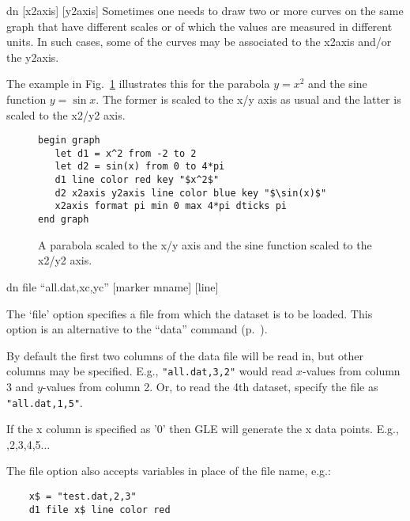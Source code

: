 \begin{commanddescription}
\item[{\sf dn [x2axis] [y2axis]}]
 
Sometimes one needs to draw two or more curves on the same graph that have different scales or of which the values are measured in different units. In such cases, some of the curves may be associated to the x2axis and/or the y2axis.

The example in Fig.~\ref{fig:y2scale} illustrates this for the parabola $y = x^2$ and the sine function $y = \sin{x}$. The former is scaled to the x/y axis as usual and the latter is scaled to the x2/y2 axis.

\begin{figure}[tb]
\begin{minipage}[c]{9.2cm}
\begin{Verbatim}
begin graph
   let d1 = x^2 from -2 to 2
   let d2 = sin(x) from 0 to 4*pi
   d1 line color red key "$x^2$"
   d2 x2axis y2axis line color blue key "$\sin(x)$"
   x2axis format pi min 0 max 4*pi dticks pi
end graph
\end{Verbatim}
\end{minipage}
\hfill
\begin{minipage}[c]{7cm}
\mbox{}
\end{minipage}
\caption{\label{fig:y2scale}A parabola scaled to the x/y axis and the sine function scaled to the x2/y2 axis.}
\end{figure}

\item[{\sf dn file ``all.dat,xc,yc'' [marker {\sf mname}] [line]}   ]

The `file' option specifies a file from which the dataset is to be loaded. This option is an alternative to the ``data'' command (p.~\pageref{cmd:data}).

By default the first two columns of the data file will be read in, but other columns may be specified.
E.g., \verb+"all.dat,3,2"+ would read $x$-values from column 3 and $y$-values from column 2. Or, to read the 4th dataset, specify the file as \verb+"all.dat,1,5"+.

If the x column is specified as {\sf '0'} then GLE will generate the x data points. E.g., {,2,3,4,5...}

The file option also accepts variables in place of the file name, e.g.:

\begin{Verbatim}
	x$ = "test.dat,2,3"
	d1 file x$ line color red
\end{Verbatim}


\end{commanddescription}
